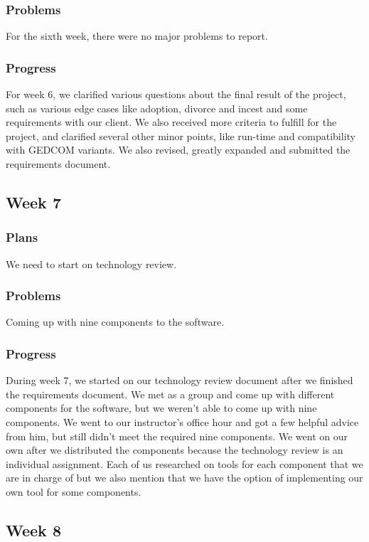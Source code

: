 \documentclass[onecolumn, draftclsnofoot, 10pt, compsoc]{IEEEtran}
\begin{document}
\subsubsection{Problems}
For the sixth week, there were no major problems to report.
\subsubsection{Progress}
For week 6, we clarified various questions about the final result of the project, such as various edge cases like adoption, divorce and incest and some requirements with our client. We also received more criteria to fulfill for the project, and clarified several other minor points, like run-time and compatibility with GEDCOM variants. We also revised, greatly expanded and submitted the requirements document.

\subsection{Week 7}
\subsubsection{Plans}
We need to start on technology review.

\subsubsection{Problems}
Coming up with nine components to the software.

\subsubsection{Progress}
During week 7, we started on our technology review document after we finished the requirements document. We met as a group and come up with different components for the software, but we weren't able to come up with nine components. We went to our instructor's office hour and got a few helpful advice from him, but still didn't meet the required nine components. We went on our own after we distributed the components because the technology review is an individual assignment. Each of us researched on tools for each component that we are in charge of but we also mention that we have the option of implementing our own tool for some components.  


\subsection{Week 8}
\end{document}
